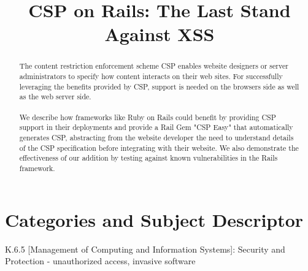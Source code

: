 \documentclass[10pt, conference, compsocconf]{IEEEtran}
\begin{document}
%
\title{CSP on Rails: The Last Stand Against XSS}



\author{
}

\maketitle


\begin{abstract}
The content restriction enforcement scheme CSP enables website designers or server administrators to specify how content interacts on their web sites. For successfully leveraging the benefits provided by CSP, support is needed on the browsers side as well as the web server side. \\ \\
We describe how frameworks like Ruby on Rails could benefit by providing CSP support in their deployments and provide a Rail Gem "CSP Easy" that automatically generates CSP, abstracting from the website developer the need to understand details of the CSP specification before integrating with their website. We also demonstrate the effectiveness of our addition by testing against known vulnerabilities in the Rails framework.

\end{abstract}

\section{Categories and Subject Descriptor} %
\label{sec:categories_and_subject_descriptor}
K.6.5 [Management of Computing and Information
Systems]: Security and Protection - unauthorized access,
invasive software
\end{document}
